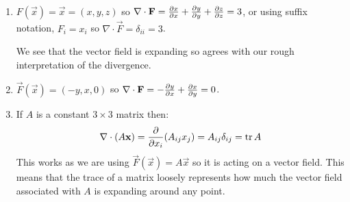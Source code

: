 \documentclass[../main.tex]{subfiles}
\begin{document}
\begin{example}
  \label{divExample}
  \begin{enumerate}
    \item $F(\vec{x}) = \vec{x} = (x, y, z)$ so $\nabla \cdot \vec{F} = \pderiv{x}{x} + \pderiv{y}{y} + \pderiv{z}{z} = 3$, or using suffix notation, $F_i = x_i$ so $\nabla \cdot \vec{F} = \delta_{i i} = 3$.
      \begin{center}
      \end{center}
      We see that the vector field is expanding so agrees with our rough interpretation of the divergence.
    \item $\vec{F}(\vec{x}) = (-y, x, 0)$ so $\nabla \cdot \vec{F} = -\pderiv{y}{x} + \pderiv{x}{y} = 0$.
    \item If $A$ is a constant $3 \times 3$ matrix then:
      \[
        \nabla \cdot (A \vec{x}) = \pderiv{}{x_i}(A_{i j }x_j) = A_{i j}\delta_{i j} = \tr A
      \]
      This works as we are using $\vec{F}(\vec{x}) = A\vec{x}$ so it is acting on a vector field.
      This means that the trace of a matrix loosely represents how much the vector field associated with $A$ is expanding around any point.
  \end{enumerate}
\end{example}
\end{document}
